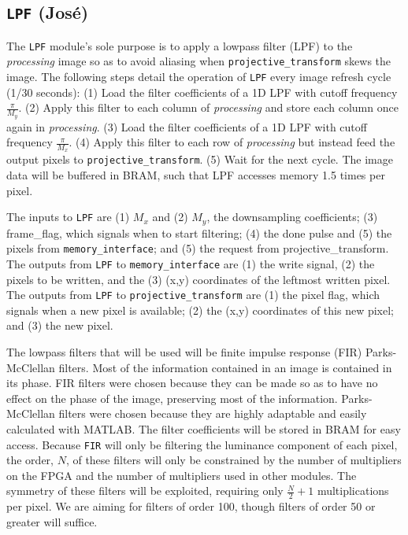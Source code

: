 \documentclass[10pt]{article}
\begin{document}
\subsection{{\tt LPF} (Jos\'{e})}
The {\tt LPF} module's sole purpose is to apply a lowpass filter (LPF) to the {\it processing} image so as to avoid aliasing when {\tt projective\_transform} skews the image. The following steps detail the operation of {\tt LPF} every image refresh cycle (1/30 seconds): (1) Load the filter coefficients of a 1D LPF with cutoff frequency \( \frac{\pi}{M_y} \). (2) Apply this filter to each column of {\it processing} and store each column once again in {\it processing}. (3) Load the filter coefficients of a 1D LPF with cutoff frequency \( \frac{\pi}{M_x} \). (4) Apply this filter to each row of {\it processing} but instead feed the output pixels to {\tt projective\_transform}. (5) Wait for the next cycle. The image data will be buffered in BRAM, such that LPF accesses memory 1.5 times per pixel.

The inputs to {\tt LPF} are (1) \( M_x \) and (2) \( M_y \), the downsampling coefficients; (3) frame\_flag, which signals when to start filtering; (4) the done pulse and (5) the pixels from {\tt memory\_interface}; and (5) the request from {projective\_transform}. The outputs from {\tt LPF} to {\tt memory\_interface} are (1) the write signal, (2) the pixels to be written, and the (3) (x,y) coordinates of the leftmost written pixel. The outputs from {\tt LPF} to {\tt projective\_transform} are (1) the pixel flag, which signals when a new pixel is available; (2) the (x,y) coordinates of this new pixel; and (3) the new pixel.

The lowpass filters that will be used will be finite impulse response (FIR) Parks-McClellan filters. Most of the information contained in an image is contained in its phase. FIR filters were chosen because they can be made so as to have no effect on the phase of the image, preserving most of the information. Parks-McClellan filters were chosen because they are highly adaptable and easily calculated with MATLAB. The filter coefficients will be stored in BRAM for easy access. Because {\tt FIR} will only be filtering the luminance component of each pixel, the order, \( N \), of these filters will only be constrained by the number of multipliers on the FPGA and the number of multipliers used in other modules. The symmetry of these filters will be exploited, requiring only \( \frac{N}{2}+1 \) multiplications per pixel. We are aiming for filters of order 100, though filters of order 50 or greater will suffice.
\end{document}
